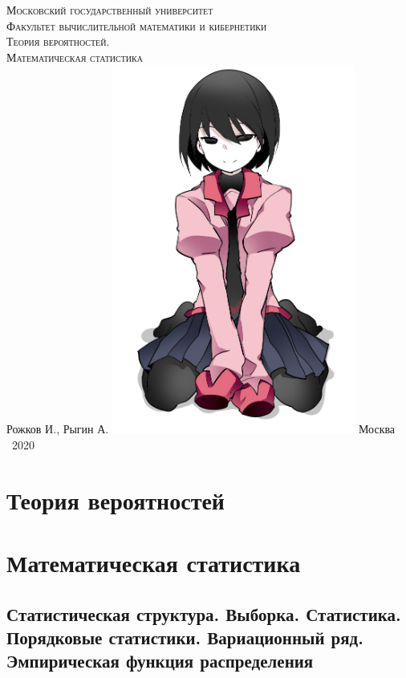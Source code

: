 \documentclass[oneside,final,14pt]{extreport}
\theoremstyle{definition}
\begin{document}
\begin{titlepage}
    \centering
    \vfill
    {\scshape\large
        Московский государственный университет\\
        Факультет вычислительной математики и кибернетики\\
    }
    \vskip1cm
    {\scshape\huge
        Теория вероятностей.\\
        Математическая статистика\\
    }
    \vskip0.5cm
    {\upshape\large
        Рожков И., Рыгин А.
    }    
    \vfill
    \includegraphics[width=8cm]{pic.png}
    \vfill
    {\upshape\large
        Москва\\
        ~2020
    }
\end{titlepage}

\tableofcontents
\chapter{Теория вероятностей}
\chapter{Математическая статистика}
\section{Статистическая структура. Выборка. Статистика. Порядковые статистики. Вариационный ряд. Эмпирическая функция распределения}
\end{document}

